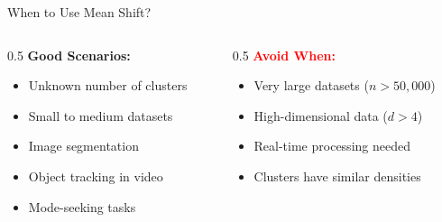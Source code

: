 \begin{frame}{When to Use Mean Shift?}
    \begin{columns}[T]
        \begin{column}{0.5\textwidth}
            \textbf{\textcolor{green!60!black}{Good Scenarios:}}
            \begin{itemize}
                \item Unknown number of clusters
                \item Small to medium datasets
                \item Image segmentation
                \item Object tracking in video
                \item Mode-seeking tasks
            \end{itemize}
        \end{column}

        \begin{column}{0.5\textwidth}
            \textbf{\textcolor{red}{Avoid When:}}
            \begin{itemize}
                \item Very large datasets ($n > 50{,}000$)
                \item High-dimensional data ($d > 4$)
                \item Real-time processing needed
                \item Clusters have similar densities
            \end{itemize}
        \end{column}
    \end{columns}
\end{frame}
